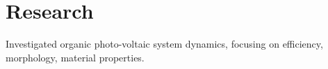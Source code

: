 \documentclass[letterpaper]{deedy-resume} %
\begin{document}
\begin{minipage}[t]{0.66\textwidth}
\sectionspace %



\section{Research}


Investigated organic photo-voltaic system dynamics, focusing on efficiency, morphology, material properties.



\end{minipage} %








\end{document}
